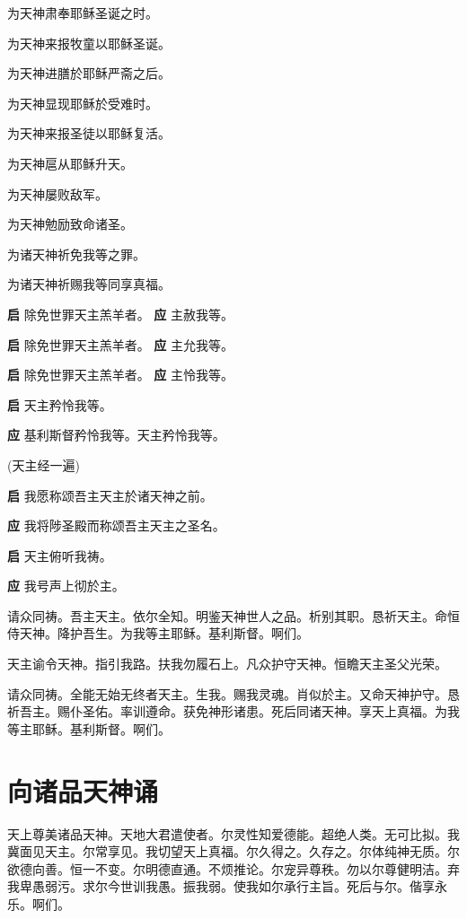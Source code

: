 \documentclass[UTF8,17pt]{ctexart}
\begin{document}
 为天神肃奉耶稣圣诞之时。

 为天神来报牧童以耶稣圣诞。

 为天神进膳於耶稣严斋之后。

 为天神显现耶稣於受难时。

 为天神来报圣徒以耶稣复活。

 为天神扈从耶稣升天。

 为天神屡败敌军。

 为天神勉励致命诸圣。

 为诸天神祈免我等之罪。

 为诸天神祈赐我等同享真福。

\textbf{启} \quad 除免世罪天主羔⽺者。 \hfill \textbf{应} \quad 主赦我等。

\textbf{启} \quad 除免世罪天主羔⽺者。 \hfill \textbf{应} \quad 主允我等。

\textbf{启} \quad 除免世罪天主羔⽺者。 \hfill \textbf{应} \quad 主怜我等。

\textbf{启} \quad 天主矜怜我等。

\textbf{应} \quad 基利斯督矜怜我等。天主矜怜我等。

(天主经一遍)

\textbf{启} \quad 我愿称颂吾主天主於诸天神之前。

\textbf{应} \quad 我将陟圣殿⽽称颂吾主天主之圣名。

\textbf{启} \quad 天主俯听我祷。

\textbf{应} \quad 我号声上彻於主。

请众同祷。吾主天主。依尔全知。明鉴天神世⼈之品。析别其职。恳祈天主。命恒侍天神。降护吾⽣。为我等主耶稣。基利斯督。啊们。

天主谕令天神。指引我路。扶我勿履⽯上。凡众护守天神。恒瞻天主圣⽗光荣。

请众同祷。全能⽆始⽆终者天主。⽣我。赐我灵魂。肖似於主。又命天神护守。恳祈吾主。赐仆圣佑。率训遵命。获免神形诸患。死后同诸天神。享天上真福。为我等主耶稣。基利斯督。啊们。

\section{向诸品天神诵}

天上尊美诸品天神。天地⼤君遣使者。尔灵性知爱德能。超绝⼈类。⽆可⽐拟。我冀⾯见天主。尔常享见。我切望天上真福。尔久得之。久存之。尔体纯神⽆质。尔欲德向善。恒⼀不变。尔明德直通。不烦推论。尔宠异尊秩。勿以尔尊健明洁。弃我卑愚弱污。求尔今世训我愚。振我弱。使我如尔承⾏主旨。死后与尔。偕享永乐。啊们。
\end{document}
